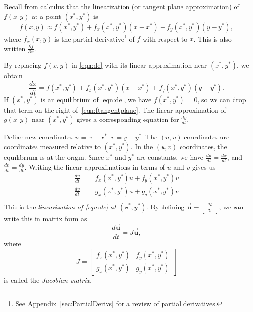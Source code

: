 \documentclass[reqno]{immbook}
\newcommand{\BU}{\vec{\textbf{u}}}
\numberwithin{equation}{chapter}
\numberwithin{question}{section}
\numberwithin{theorem}{chapter}
\numberwithin{figure}{chapter}
\theoremstyle{definition}
\begin{document}
Recall from calculus
that the linearization (or tangent plane approximation)
of $f(x,y)$ at a point $(x^*,y^*)$ is
\begin{equation}
  f(x,y) \approx f(x^*,y^*)+f_x(x^*,y^*)(x-x^*) + f_y(x^*,y^*)(y-y^*),
\end{equation}
where $f_x(x,y)$ is the partial derivative\footnote{%
See Appendix~\ref{sec:PartialDerivs} for a review
of partial derivatives.}
of $f$ with respect to $x$.
This is also written $\frac{\partial f}{\partial x}$.

By replacing $f(x,y)$ in \eqref{eqn:de}
with its linear approximation near $(x^*,y^*)$,
we obtain
\begin{equation}
   \frac{dx}{dt} = f(x^*,y^*)+f_x(x^*,y^*)(x-x^*) + f_y(x^*,y^*)(y-y^*).
   \label{eqn:ftangentplane}
\end{equation}
If $(x^*,y^*)$ is an equilibrium of \eqref{eqn:de}, we have
$f(x^*,y^*)=0$, so we can drop that term on the right
of~\eqref{eqn:ftangentplane}.
The linear approximation of $g(x,y)$ near $(x^*,y^*)$ gives
a corresponding equation for $\frac{dy}{dt}$.

Define new coordinates $u = x-x^*$, $v = y-y^*$.
The $(u,v)$ coordinates are coordinates measured relative to $(x^*,y^*)$.
In the $(u,v)$ coordinates, the equilibrium is at the origin.
Since $x^*$ and $y^*$ are constants, we have $\frac{du}{dt} = \frac{dx}{dt}$,
and $\frac{dv}{dt} = \frac{dy}{dt}$.  Writing the linear approximations
in terms of $u$ and $v$ gives us
\begin{equation}
\begin{split}
  \frac{du}{dt} & = f_x(x^*,y^*)u + f_y(x^*,y^*)v \\
  \frac{dv}{dt} & = g_x(x^*,y^*)u + g_y(x^*,y^*)v \\
\end{split}
\end{equation}
This is the \emph{linearization of \eqref{eqn:de} at $(x^*,y^*)$}.
By defining $\BU = \begin{bmatrix} u \\ v \end{bmatrix}$, we can write
this in matrix form as
\begin{equation}
  \frac{d\BU}{dt} = J\BU,
\label{eqn:linearizedde}
\end{equation}
where
\begin{equation}
   J = \begin{bmatrix}
             f_x(x^*,y^*) & f_y(x^*,y^*) \\
	     g_x(x^*,y^*) & g_y(x^*,y^*)
       \end{bmatrix}
\label{eqn:jac}
\end{equation}
is called the \emph{Jacobian matrix}.
\end{document}
